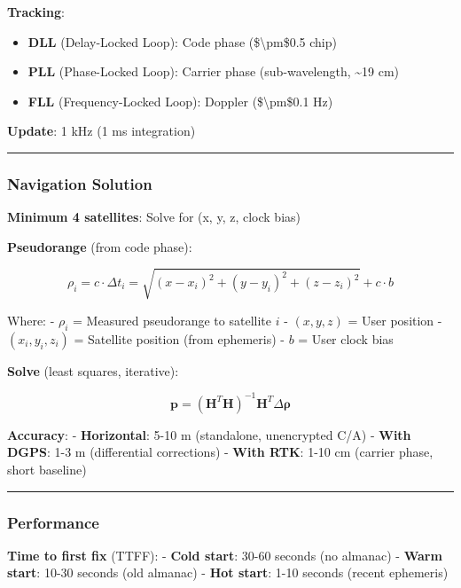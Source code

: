 \textbf{Tracking}:

\begin{itemize}
\tightlist
\item
  \textbf{DLL} (Delay-Locked Loop): Code phase (\$\textbackslash pm\$0.5
  chip)
\item
  \textbf{PLL} (Phase-Locked Loop): Carrier phase (sub-wavelength,
  \textasciitilde19 cm)
\item
  \textbf{FLL} (Frequency-Locked Loop): Doppler
  (\$\textbackslash pm\$0.1 Hz)
\end{itemize}

\textbf{Update}: 1 kHz (1 ms integration)

\begin{center}\rule{0.5\linewidth}{0.5pt}\end{center}

\subsubsection{Navigation Solution}\label{navigation-solution}

\textbf{Minimum 4 satellites}: Solve for (x, y, z, clock bias)

\textbf{Pseudorange} (from code phase):

\[
\rho_i = c \cdot \Delta t_i = \sqrt{(x - x_i)^2 + (y - y_i)^2 + (z - z_i)^2} + c \cdot b
\]

Where: - \(\rho_i\) = Measured pseudorange to satellite \(i\) -
\((x, y, z)\) = User position - \((x_i, y_i, z_i)\) = Satellite position
(from ephemeris) - \(b\) = User clock bias

\textbf{Solve} (least squares, iterative):

\[
\mathbf{p} = (\mathbf{H}^T \mathbf{H})^{-1} \mathbf{H}^T \Delta\boldsymbol{\rho}
\]

\textbf{Accuracy}: - \textbf{Horizontal}: 5-10 m (standalone,
unencrypted C/A) - \textbf{With DGPS}: 1-3 m (differential corrections)
- \textbf{With RTK}: 1-10 cm (carrier phase, short baseline)

\begin{center}\rule{0.5\linewidth}{0.5pt}\end{center}

\subsubsection{Performance}\label{performance-3}

\textbf{Time to first fix} (TTFF): - \textbf{Cold start}: 30-60 seconds
(no almanac) - \textbf{Warm start}: 10-30 seconds (old almanac) -
\textbf{Hot start}: 1-10 seconds (recent ephemeris)

